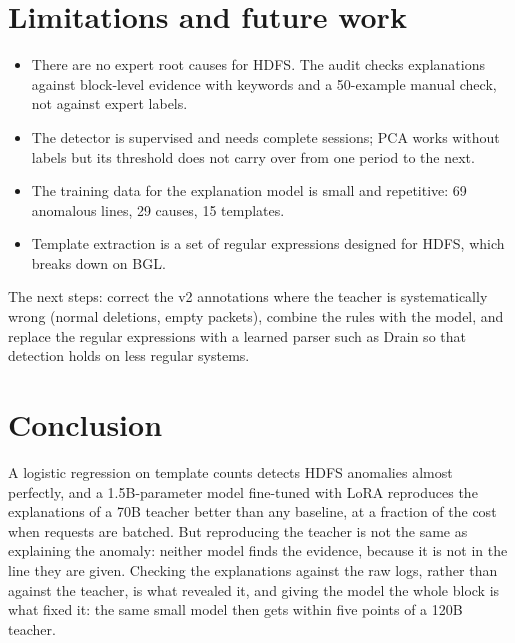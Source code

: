 \documentclass[11pt,a4paper]{article}
\begin{document}
\section{Limitations and future work}
\begin{itemize}
  \item There are no expert root causes for HDFS. The audit checks explanations against
        block-level evidence with keywords and a 50-example manual check, not against expert labels.
  \item The detector is supervised and needs complete sessions; PCA works without labels but its
        threshold does not carry over from one period to the next.
  \item The training data for the explanation model is small and repetitive: 69 anomalous lines,
        29 causes, 15 templates.
  \item Template extraction is a set of regular expressions designed for HDFS, which breaks down
        on BGL.
\end{itemize}
The next steps: correct the v2 annotations where the teacher is systematically wrong (normal
deletions, empty packets), combine the rules with the model, and replace the regular
expressions with a learned parser such as Drain so that detection holds on less regular
systems.

\section{Conclusion}
A logistic regression on template counts detects HDFS anomalies almost perfectly, and a
1.5B-parameter model fine-tuned with LoRA reproduces the explanations of a 70B teacher better
than any baseline, at a fraction of the cost when requests are batched. But reproducing the
teacher is not the same as explaining the anomaly: neither model finds the evidence, because
it is not in the line they are given. Checking the explanations against the raw logs, rather
than against the teacher, is what revealed it, and giving the model the whole block is what
fixed it: the same small model then gets within five points of a 120B teacher.
\end{document}
